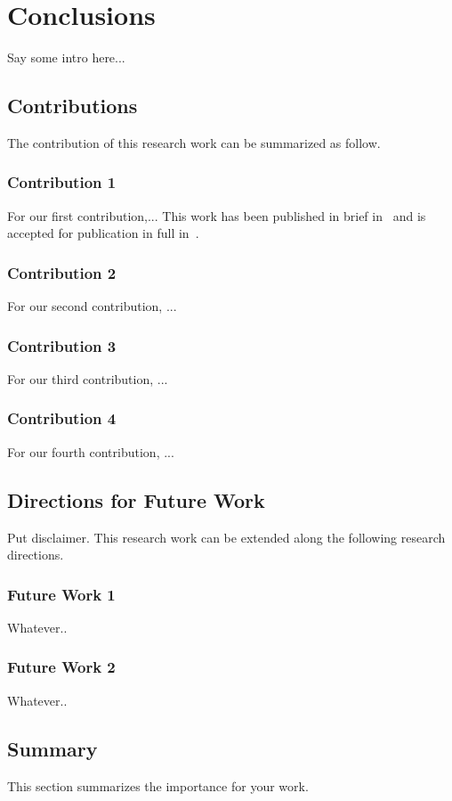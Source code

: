 \chapter{Conclusions}\label{c7}%

Say some intro here...

\section{Contributions}
The contribution of this research work can be summarized as follow.

\subsection{Contribution 1}%
For our first contribution,... This work has been published in brief
in~\cite{c1} and is accepted for publication in full in~\cite{j1}.

\subsection{Contribution 2} %
For our second contribution, ...

\subsection{Contribution 3} %
For our third contribution, ...

\subsection{Contribution 4} %
For our fourth contribution, ...

\section{Directions for Future Work}
Put disclaimer. This research work can be extended along the
following research directions.

\subsection{Future Work 1}
Whatever..

\subsection{Future Work 2}
Whatever..

\section{Summary}
This section summarizes the importance for your work.
